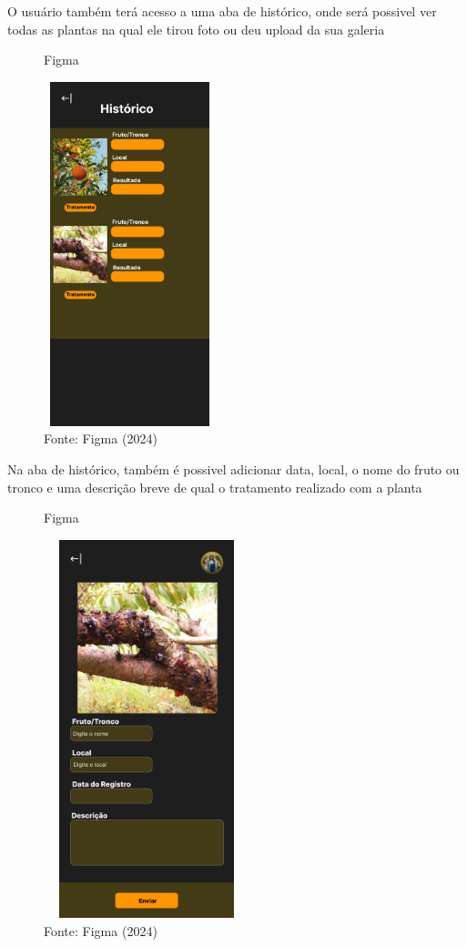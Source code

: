 \documentclass[
  a4paper,%
  12pt,%
  english,%
  brazilian,%
]{article}
\begin{document}
O usuário também terá acesso a uma aba de histórico, onde será possivel ver todas as plantas na qual ele tirou foto ou deu upload da sua galeria

\begin{figure}[H]
    \centering
    \caption*{Figma}
    \includegraphics[width=5cm,height=10cm]{Illustrations/figma8.png}
    \caption*{Fonte: Figma (2024)}
    \label{fig:fig8}
\end{figure}

Na aba de histórico, também é possivel adicionar data, local, o nome do fruto ou tronco e uma descrição breve de qual o tratamento realizado com a planta 

\begin{figure}[H]
    \centering
    \caption*{Figma}
    \includegraphics[width=6cm,height=11cm]{Illustrations/figma9.png}
    \caption*{Fonte: Figma (2024)}
    \label{fig:fig9}
\end{figure}
\end{document}
